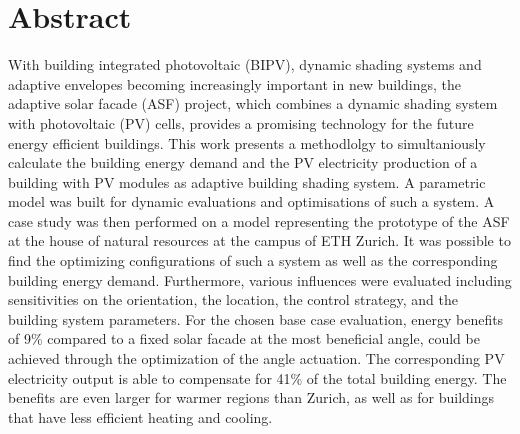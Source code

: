 \chapter*{Abstract}
With building integrated photovoltaic (BIPV), dynamic shading systems and adaptive envelopes becoming increasingly important in new buildings, the adaptive solar facade (ASF) project, which combines a dynamic shading system with photovoltaic (PV) cells, provides a promising technology for the future energy efficient buildings. This work presents a methodlolgy to simultaniously calculate the building energy demand and the PV electricity production of a building with PV modules as adaptive building shading system. A parametric model was built for dynamic evaluations and optimisations of such a system. A case study was then performed on a model representing the prototype of the ASF at the house of natural resources at the campus of ETH Zurich. It was possible to find the optimizing configurations of such a system as well as the corresponding building energy demand. Furthermore, various influences were evaluated including sensitivities on the orientation, the location, the control strategy, and the building system parameters. For the chosen base case evaluation, energy benefits of 9\% compared to a fixed solar facade at the most beneficial angle, could be achieved through the optimization of the angle actuation. The corresponding PV electricity output is able to compensate for 41\% of the total building energy. The benefits are even larger for warmer regions than Zurich, as well as for buildings that have less efficient heating and cooling. 
\newpage